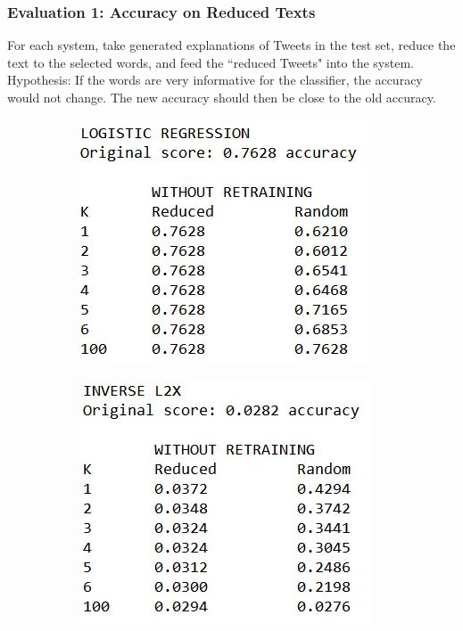 {\color{blue}
\subsubsection{Evaluation 1: Accuracy on Reduced Texts}
For each system, take generated explanations of Tweets in the test set, reduce the text to the selected words, and feed the ``reduced Tweets" into the system. Hypothesis: If the words are very informative for the classifier, the accuracy would not change. The new accuracy should then be close to the old accuracy.\newline
\begin{figure}[H]
	\centering
	\begin{subfigure}[b]{0.4\textwidth}
		\includegraphics[width=\textwidth]{img/expleval1_logreg.JPG}
	\end{subfigure}
	\begin{subfigure}[b]{0.4\textwidth}
		\includegraphics[width=\textwidth]{img/expleval1_invL2X.JPG}

\end{subfigure}
\end{figure}}

